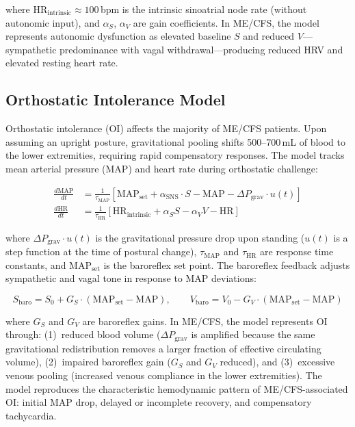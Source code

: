 where $\text{HR}_{\text{intrinsic}} \approx 100$\,bpm is the intrinsic sinoatrial node rate (without autonomic input), and $\alpha_S$, $\alpha_V$ are gain coefficients. In ME/CFS, the model represents autonomic dysfunction as elevated baseline $S$ and reduced $V$---sympathetic predominance with vagal withdrawal---producing reduced HRV and elevated resting heart rate.

\subsection{Orthostatic Intolerance Model}
\label{sec:orthostatic-model}

Orthostatic intolerance (OI) affects the majority of ME/CFS patients. Upon assuming an upright posture, gravitational pooling shifts 500--700\,mL of blood to the lower extremities, requiring rapid compensatory responses. The model tracks mean arterial pressure (MAP) and heart rate during orthostatic challenge:

\begin{align}
\label{eq:orthostatic}
\frac{d\text{MAP}}{dt} &= \frac{1}{\tau_{\text{MAP}}} \left[ \text{MAP}_{\text{set}} + \alpha_{\text{SNS}} \cdot S - \text{MAP} - \Delta P_{\text{grav}} \cdot u(t) \right] \\
\frac{d\text{HR}}{dt} &= \frac{1}{\tau_{\text{HR}}} \left[ \text{HR}_{\text{intrinsic}} + \alpha_S S - \alpha_V V - \text{HR} \right]
\end{align}

where $\Delta P_{\text{grav}} \cdot u(t)$ is the gravitational pressure drop upon standing ($u(t)$ is a step function at the time of postural change), $\tau_{\text{MAP}}$ and $\tau_{\text{HR}}$ are response time constants, and $\text{MAP}_{\text{set}}$ is the baroreflex set point. The baroreflex feedback adjusts sympathetic and vagal tone in response to MAP deviations:

\begin{equation}
\label{eq:baroreflex}
S_{\text{baro}} = S_0 + G_S \cdot (\text{MAP}_{\text{set}} - \text{MAP}), \qquad V_{\text{baro}} = V_0 - G_V \cdot (\text{MAP}_{\text{set}} - \text{MAP})
\end{equation}

where $G_S$ and $G_V$ are baroreflex gains. In ME/CFS, the model represents OI through: (1)~reduced blood volume ($\Delta P_{\text{grav}}$ is amplified because the same gravitational redistribution removes a larger fraction of effective circulating volume), (2)~impaired baroreflex gain ($G_S$ and $G_V$ reduced), and (3)~excessive venous pooling (increased venous compliance in the lower extremities). The model reproduces the characteristic hemodynamic pattern of ME/CFS-associated OI: initial MAP drop, delayed or incomplete recovery, and compensatory tachycardia.

